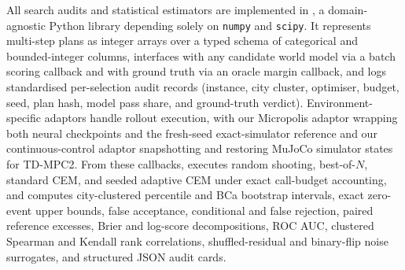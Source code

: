 All search audits and statistical estimators are implemented in \hpd{}, a domain-agnostic Python library depending solely on \texttt{numpy} and \texttt{scipy}. It represents multi-step plans as integer arrays over a typed schema of categorical and bounded-integer columns, interfaces with any candidate world model via a batch scoring callback and with ground truth via an oracle margin callback, and logs standardised per-selection audit records (instance, city cluster, optimiser, budget, seed, plan hash, model pass share, and ground-truth verdict). Environment-specific adaptors handle rollout execution, with our Micropolis adaptor wrapping both neural checkpoints and the fresh-seed exact-simulator reference and our continuous-control adaptor snapshotting and restoring MuJoCo simulator states for TD-MPC2. From these callbacks, \hpd{} executes random shooting, best-of-$N$, standard CEM, and seeded adaptive CEM under exact call-budget accounting, and computes city-clustered percentile and BCa bootstrap intervals, exact zero-event upper bounds, false acceptance, conditional and false rejection, paired reference excesses, Brier and log-score decompositions, ROC AUC, clustered Spearman and Kendall rank correlations, shuffled-residual and binary-flip noise surrogates, and structured JSON audit cards.

